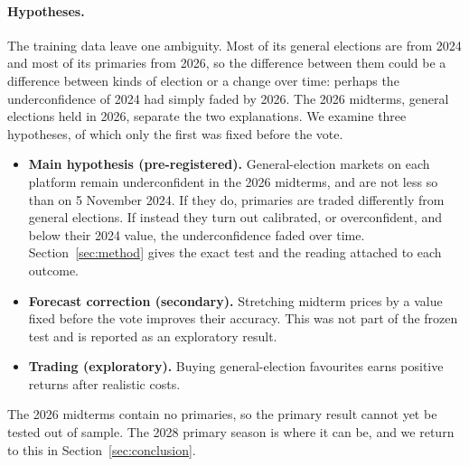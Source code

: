 \paragraph{Hypotheses.}
The training data leave one ambiguity. Most of its general elections are from 2024 and most of its primaries from 2026,
so the difference between them could be a difference between kinds of election or a change over time: perhaps the
underconfidence of 2024 had simply faded by 2026. The 2026 midterms, general elections held in 2026, separate the two
explanations. We examine three hypotheses, of which only the first was fixed before the vote.
\begin{itemize}
  \item \textbf{Main hypothesis (pre-registered).} General-election markets on each platform remain underconfident in
        the 2026 midterms, and are not less so than on 5 November 2024. If they do, primaries are traded differently
        from general elections. If instead they turn out calibrated, or overconfident, and below their 2024 value, the
        underconfidence faded over time. Section~\ref{sec:method} gives the exact test and the reading attached to each
        outcome.
  \item \textbf{Forecast correction (secondary).} Stretching midterm prices by a value fixed before the vote improves
        their accuracy. This was not part of the frozen test and is reported as an exploratory result.
  \item \textbf{Trading (exploratory).} Buying general-election favourites earns positive returns after realistic
        costs.
\end{itemize}
The 2026 midterms contain no primaries, so the primary result cannot yet be tested out of sample. The 2028 primary season
is where it can be, and we return to this in Section~\ref{sec:conclusion}.
